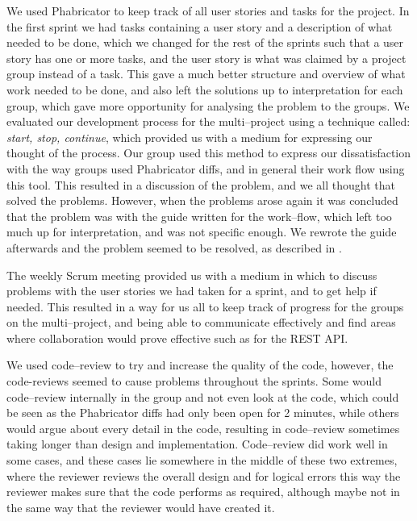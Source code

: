 We used Phabricator to keep track of all user stories and tasks for the project.
In the first sprint we had tasks containing a user story and a description of what needed to be done, which we changed for the rest of the sprints such that a user story has one or more tasks, and the user story is what was claimed by a project group instead of a task.
This gave a much better structure and overview of what work needed to be done, and also left the solutions up to interpretation for each group, which gave more opportunity for analysing the problem to the groups.
We evaluated our development process for the multi--project using a technique called: \textit{start, stop, continue}, which provided us with a medium for expressing our thought of the process.
Our group used this method to express our dissatisfaction with the way groups used Phabricator diffs, and in general their work flow using this tool.
This resulted in a discussion of the problem, and we all thought that solved the problems.
However, when the problems arose again it was concluded that the problem was with the guide written for the work--flow, which left too much up for interpretation, and was not specific enough.
We rewrote the guide afterwards and the problem seemed to be resolved, as described in .

The weekly Scrum meeting provided us with a medium in which to discuss problems with the user stories we had taken for a sprint, and to get help if needed.
This resulted in a way for us all to keep track of progress for the groups on the multi--project, and being able to communicate effectively and find areas where collaboration would prove effective such as for the REST API.

We used code--review to try and increase the quality of the code, however, the code-reviews seemed to cause problems throughout the sprints.
Some would code--review internally in the group and not even look at the code, which could be seen as the Phabricator diffs had only been open for 2 minutes, while others would argue about every detail in the code, resulting in code--review sometimes taking longer than design and implementation.
Code--review did work well in some cases, and these cases lie somewhere in the middle of these two extremes, where the reviewer reviews the overall design and for logical errors this way the reviewer makes sure that the code performs as required, although maybe not in the same way that the reviewer would have created it.

